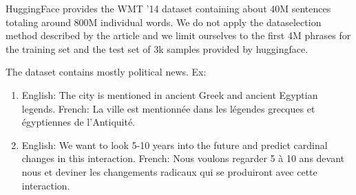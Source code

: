 HuggingFace provides the  WMT ’14 dataset containing about 40M sentences totaling around 800M individual words. 
We do not apply the dataselection method described by the article and we limit ourselves to the first 4M phrases for the training set and the test set of 3k samples provided by huggingface. 

The dataset contains mostly political news.
Ex: 
\begin{enumerate}
    \item English:  The city is mentioned in ancient Greek and ancient Egyptian legends.
French:  La ville est mentionnée dans les légendes grecques et égyptiennes de l'Antiquité.
\item English:  We want to look 5-10 years into the future and predict cardinal changes in this interaction.
French:  Nous voulons regarder 5 à 10 ans devant nous et deviner les changements radicaux qui se produiront avec cette interaction.
\end{enumerate}
